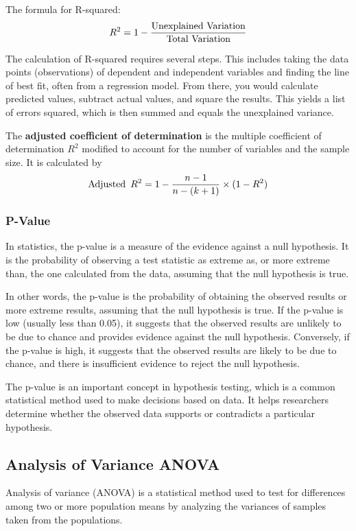 The formula for R-squared:
$$
{R}^{2} = 1 - \frac{\textup{Unexplained Variation}}{\textup{Total Variation}}
$$

The calculation of R-squared requires several steps. This includes taking the data points (observations) of dependent and independent variables and finding the line of best fit, often from a regression model. From there, you would calculate predicted values, subtract actual values, and square the results. This yields a list of errors squared, which is then summed and equals the unexplained variance.

The \textbf{adjusted coefficient of determination} is the multiple coefficient of determination $R^2$ modified to account for the number of variables and the sample size. It is calculated by
$$
\textup{Adjusted}\enskip R^2=1-\dfrac{n-1}{n-(k+1)}\times(1-R^2)
$$
\subsubsection{P-Value}
\noindent 

In statistics, the p-value is a measure of the evidence against a null hypothesis. It is the probability of observing a test statistic as extreme as, or more extreme than, the one calculated from the data, assuming that the null hypothesis is true.

In other words, the p-value is the probability of obtaining the observed results or more extreme results, assuming that the null hypothesis is true. If the p-value is low (usually less than 0.05), it suggests that the observed results are unlikely to be due to chance and provides evidence against the null hypothesis. Conversely, if the p-value is high, it suggests that the observed results are likely to be due to chance, and there is insufficient evidence to reject the null hypothesis.

The p-value is an important concept in hypothesis testing, which is a common statistical method used to make decisions based on data. It helps researchers determine whether the observed data supports or contradicts a particular hypothesis.
\subsection{Analysis of Variance ANOVA}

Analysis of variance (ANOVA) is a statistical method used to test for differences among two or more population means by analyzing the variances of samples taken from the populations.

